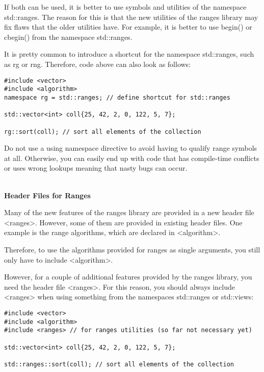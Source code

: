 If both can be used, it is better to use symbols and utilities of the namespace std::ranges. The reason for this is that the new utilities of the ranges library may fix flaws that the older utilities have. For example, it is better to use begin() or cbegin() from the namespace std::ranges.

It is pretty common to introduce a shortcut for the namespace std::ranges, such as rg or rng. Therefore, code above can also look as follows:

\begin{lstlisting}[style=styleCXX]
#include <vector>
#include <algorithm>
namespace rg = std::ranges; // define shortcut for std::ranges

std::vector<int> coll{25, 42, 2, 0, 122, 5, 7};

rg::sort(coll); // sort all elements of the collection
\end{lstlisting}

Do not use a using namespace directive to avoid having to qualify range symbols at all. Otherwise, you can easily end up with code that has compile-time conflicts or uses wrong lookups meaning that nasty bugs can occur.

\noindent
\hspace*{\fill} \\ %
\textbf{Header Files for Ranges}

Many of the new features of the ranges library are provided in a new header file <ranges>. However, some of them are provided in existing header files. One example is the range algorithms, which are declared in <algorithm>.

Therefore, to use the algorithms provided for ranges as single arguments, you still only have to include <algorithm>.

However, for a couple of additional features provided by the ranges library, you need the header file <ranges>. For this reason, you should always include <ranges> when using something from the namespaces std::ranges or std::views:

\begin{lstlisting}[style=styleCXX]
#include <vector>
#include <algorithm>
#include <ranges> // for ranges utilities (so far not necessary yet)

std::vector<int> coll{25, 42, 2, 0, 122, 5, 7};

std::ranges::sort(coll); // sort all elements of the collection
\end{lstlisting}

